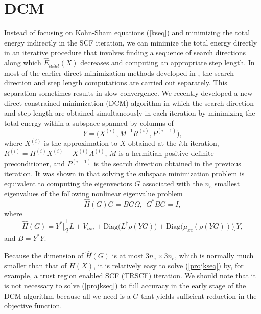 \documentclass[11pt]{book}
\newcommand{\exi} {X^{(i)}}
\newcommand{\Hi} {H^{(i)}}
\newcommand{\ri} {R^{(i)}}
\newcommand{\pim} {P^{(i-1)}}
\begin{document}
\section{DCM}\label{sec:dcm}
Instead of focusing on Kohn-Sham equations (\ref{kseq}) and minimizing
the total energy indirectly in the SCF iteration, we can minimize the 
total energy directly in an iterative procedure that involves
finding a sequence of search directions along which $\hat{E}_{total}(X)$
decreases and computing an appropriate step length. In most of the earlier 
direct minimization methods developed in 
\cite{arias:92,gillan:89,kress:cms,payne:92,teter:89,vh:2003,voorhis:2002}, 
the search direction and step length computations are carried out separately.
This separation sometimes results in slow convergence.  
We recently developed a new direct constrained minimization (DCM) 
algorithm \cite{dcm,trdcm} in which the search direction and
step length are obtained simultaneously in each iteration by 
minimizing the total energy within a subspace spanned by columns of 
\[
Y = \biggl( X^{(i)}, M^{-1}R^{(i)}, P^{(i-1)} \biggr),
\]
where $X^{(i)}$ is the approximation to $X$ obtained at the $i$th iteration,
$\ri = \Hi \exi - \exi \Lambda^{(i)}$, $M$ is a hermitian positive definite
preconditioner, and $\pim$ is the search direction
obtained in the previous iteration.  It was shown in \cite{dcm} that solving
the subspace minimization problem is equivalent to computing the 
eigenvectors $G$ associated with the $n_e$ smallest eigenvalues of the following
nonlinear eigenvalue problem
\begin{equation}
\hat{H}(G)G = BG\Omega, \ \ G^{\ast}BG = I,
\label{projkseq}
\end{equation}
where 
\begin{equation}
\hat{H}(G) = Y^{\ast} \biggl[ \frac{1}{2}L + V_{ion}
+ \mbox{Diag}\biggl(L^{\dagger} \rho(YG)\biggr)
+ \mbox{Diag}\biggl(\mu_{xc}(\rho(YG))\biggr) \biggr] Y,
\label{projham}
\end{equation}
and $B = Y^{\ast}Y$.

Because the dimension of $\hat{H}(G)$ is at most $3n_e \times 3n_e$, 
which is normally much smaller than that of $H(X)$, it is relatively
easy to solve (\ref{projkseq}) by, for example, a trust region
enabled SCF (TRSCF) iteration.
We should note that it is not necessary to solve (\ref{projkseq})
to full accuracy in the early stage of the DCM algorithm because 
all we need is a $G$ that yields sufficient reduction in the objective
function. 
\end{document}
